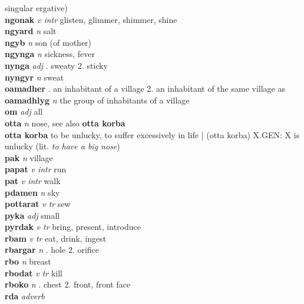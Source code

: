 singular ergative)\\\textbf{ngonak}   \emph{v intr} \textperiodcentered glisten, glimmer, shimmer, shine\\\textbf{ngyard}   \emph{n} \textperiodcentered salt\\\textbf{ngyb}   \emph{n} \textperiodcentered son (of mother)\\\textbf{ngynga}   \emph{n} \textperiodcentered sickness, fever\\\textbf{nynga}   \emph{adj} . sweaty 2. sticky \\\textbf{nyngyr}   \emph{n} \textperiodcentered sweat\\\textbf{oamadher}    . an inhabitant of a village 2. an inhabitant of the same village as \GEN \\\textbf{oamadhlyg}   \emph{n} \textperiodcentered the group of inhabitants of a village\\\textbf{om}   \emph{adj} \textperiodcentered all\\\textbf{otta}   \emph{n} \textperiodcentered nose, see also \textbf{otta korba}\\\textbf{otta korba}    \textperiodcentered to be unlucky, to suffer excessively in life | (otta korba) X.GEN: X is unlucky (lit. \emph{to have a big nose})\\\textbf{pak}   \emph{n} \textperiodcentered village\\\textbf{papat}   \emph{v intr} \textperiodcentered run\\\textbf{pat}   \emph{v intr} \textperiodcentered walk\\\textbf{pdamen}   \emph{n} \textperiodcentered sky\\\textbf{pottarat}   \emph{v tr} \textperiodcentered sew\\\textbf{pyka}   \emph{adj} \textperiodcentered small\\\textbf{pyrdak}   \emph{v tr} \textperiodcentered bring, present, introduce\\\textbf{rbam}   \emph{v tr} \textperiodcentered eat, drink, ingest\\\textbf{rbargar}   \emph{n} . hole 2. orifice \\\textbf{rbo}   \emph{n} \textperiodcentered breast\\\textbf{rbodat}   \emph{v tr} \textperiodcentered kill\\\textbf{rboko}   \emph{n} . chest 2. front, front face \\\textbf{rda}   \emph{adverb} 